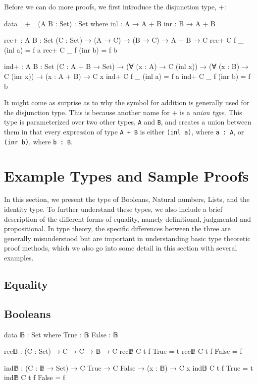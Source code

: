 \documentclass[12pt]{article}
\begin{document}
Before we can do more proofs, we first introduce the disjunction type, +: 
\begin{center}
\begin{minipage}{0.9\textwidth}
\begin{code}
data _+_ (A B : Set) : Set where
  inl : A → A + B
  inr : B → A + B

rec+ : {A B : Set} (C : Set) → (A → C) → (B → C) →
       A + B → C
rec+ C f _ (inl a) = f a
rec+ C _ f (inr b) = f b

ind+ : {A B : Set} (C : A + B → Set) →
       (∀ (x : A) → C (inl x)) →
       (∀ (x : B) → C (inr x)) →
       (x : A + B) → C x
ind+ C f _ (inl a) = f a
ind+ C _ f (inr b) = f b
\end{code}
\end{minipage}
\end{center}
It might come as surprise as to why the symbol for addition is generally used
for the disjunction type. This is because another name for + is a {\it union type}.
This type is parameterized over two other types, {\tt A} and {\tt B}, and
creates a union between them in that every expression of type {\tt A + B} is
either {\tt (inl a)}, where {\tt a : A}, or {\tt (inr b)}, where {\tt b : B}.

\section{Example Types and Sample Proofs}
In this section, we present the type of Booleans, Natural numbers, Lists,
and the identity type. To further understand these types, we also include
a brief description of the different forms of equality, namely definitional,
judgmental and propositional. In type theory, the specific differences
between the three are generally misunderstood but are important in understanding
basic type theoretic proof methods, which we also go into some detail in
this section with several examples.

\subsection*{Equality}

\subsection*{Booleans}
\begin{center}
\begin{minipage}{0.9\textwidth}
\begin{code}
data 𝔹 : Set where
  True  : 𝔹
  False : 𝔹

rec𝔹 : (C : Set) → C → C → 𝔹 → C
rec𝔹 C t f True = t
rec𝔹 C t f False = f

ind𝔹 : (C : 𝔹 → Set) → C True → C False → (x : 𝔹) → C x
ind𝔹 C t f True = t
ind𝔹 C t f False = f
\end{code}
\end{minipage}
\end{center}
\end{document}
